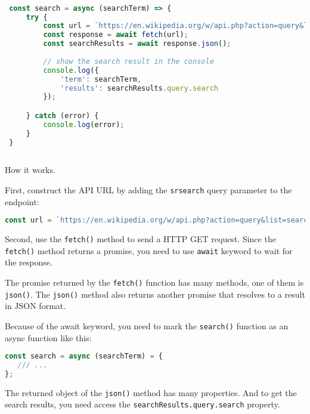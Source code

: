 \documentclass[11pt]{article}
\begin{document}
\begin{lstlisting}[language=JavaScript]

 const search = async (searchTerm) => {
     try {
         const url = `https://en.wikipedia.org/w/api.php?action=query&list=search&prop=info|extracts&inprop=url&utf8=&format=json&origin=*&srlimit=10&srsearch=${searchTerm}`;
         const response = await fetch(url);
         const searchResults = await response.json();
 
         // show the search result in the console
         console.log({
             'term': searchTerm,
             'results': searchResults.query.search
         });

     } catch (error) {
         console.log(error);
     }
 }
 
\end{lstlisting}

\noindent
How it works.
\newline

\noindent
First, construct the API URL by adding the \verb|srsearch| query parameter
to the endpoint:

\begin{lstlisting}[language=JavaScript]
const url = `https://en.wikipedia.org/w/api.php?action=query&list=search&prop=info|extracts&inprop=url&utf8=&format=json&origin=*&srlimit=10&srsearch=${searchTerm}`;
\end{lstlisting}

\noindent
Second, use the \verb|fetch()| method to send a HTTP GET request. Since
the \verb|fetch()| method returns a promise, you need to use \verb|await| keyword
to wait for the response.
\newline

\noindent
The promise returned by the \verb|fetch()| function has many methods,
one of them is \verb|json()|. The \verb|json()| method also returns another promise
that resolves to a result in JSON format.
\newline

\noindent
Because of the await keyword, you need to mark the \verb|search()| function
as an async function like this:

\begin{lstlisting}[language=JavaScript]
const search = async (searchTerm) = {
   /// ...
};
\end{lstlisting}

\noindent
The returned object of the \verb|json()| method has many properties.
And to get the search results, you need access
the \verb|searchResults.query.search| property.
\newline
\end{document}
